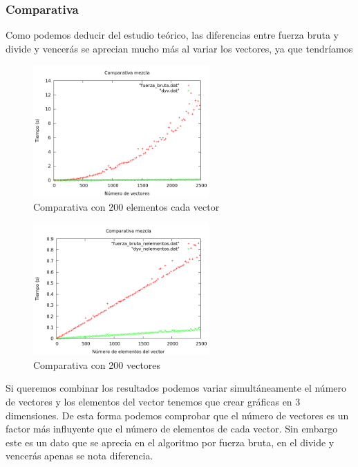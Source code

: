 \subsubsection{Comparativa}
Como podemos deducir del estudio te\'orico, las diferencias entre fuerza bruta y divide y vencer\'as se aprecian mucho m\'as al variar los vectores, ya que tendr\'iamos 
\begin{figure}[htb] 
\centering
	\includegraphics[width=0.6\textwidth]{../Obligatorio/Graficas/comparativa_kvectores.png}
	\caption{Comparativa con 200 elementos cada vector} 
	\label{fig:comp_kvectores} 
\end{figure}

\begin{figure}[htb] 
\centering
	\includegraphics[width=0.6\textwidth]{../Obligatorio/Graficas/comparativa_nelementos.png}
	\caption{Comparativa con 200 vectores} 
	\label{fig:comp_nelementos} 
\end{figure}

\newpage
Si queremos combinar los resultados podemos variar simult\'aneamente el n\'umero de vectores y los elementos del vector tenemos que crear gr\'aficas en $3$ dimensiones.
De esta forma podemos comprobar que el n\'umero de vectores es un factor m\'as influyente que el n\'umero de elementos de cada vector. Sin embargo este es un dato que se aprecia en el algoritmo por fuerza bruta, en el divide y vencer\'as apenas se nota diferencia.

